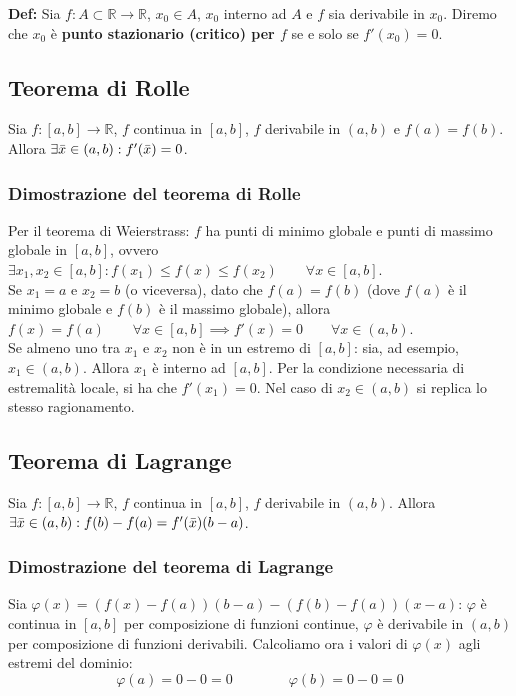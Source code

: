 \documentclass{article}
\begin{document}
\noindent\textbf{Def:} Sia $f: A \subset \mathbb{R} \xrightarrow{} \mathbb{R}$, $x_0 \in A$, $x_0$ interno ad $A$ e $f$ sia derivabile in $x_0$. Diremo che $x_0$ è \textbf{punto stazionario (critico) per $f$} se e solo se $f'(x_0) = 0$.

\subsection{Teorema di Rolle}
Sia $f: [a, b] \xrightarrow{} \mathbb{R}$, $f$ continua in $[a, b]$, $f$ derivabile in $(a, b)$ e $f(a) = f(b)$. Allora $\exists \Bar{x} \in (a, b) : f'(\Bar{x}) = 0$.

\subsubsection{Dimostrazione del teorema di Rolle}
Per il teorema di Weierstrass: $f$ ha punti di minimo globale e punti di massimo globale in $[a, b]$, ovvero $\exists x_1, x_2 \in [a, b] : f(x_1) \leq f(x) \leq f(x_2) \qquad \forall x \in [a, b]$.\\
Se $x_1 = a$ e $x_2 = b$ (o viceversa), dato che $f(a) = f(b)$ (dove $f(a)$ è il minimo globale e $f(b)$ è il massimo globale), allora $f(x) = f(a) \qquad \forall x \in [a, b] \implies f'(x) = 0 \qquad \forall x \in (a, b)$.\\
Se almeno uno tra $x_1$ e $x_2$ non è in un estremo di $[a, b]$: sia, ad esempio, $x_1 \in (a, b)$. Allora $x_1$ è interno ad $[a, b]$. Per la condizione necessaria di estremalità locale, si ha che $f'(x_1) = 0$. Nel caso di $x_2 \in (a, b)$ si replica lo stesso ragionamento.

\subsection{Teorema di Lagrange}
Sia $f: [a, b] \xrightarrow{} \mathbb{R}$, $f$ continua in $[a, b]$, $f$ derivabile in $(a, b)$. Allora $\exists \Bar{x} \in (a, b) : f(b) - f(a) = f'(\Bar{x})(b - a)$.

\subsubsection{Dimostrazione del teorema di Lagrange}
Sia $\varphi(x) = (f(x) - f(a))(b - a) - (f(b) - f(a))(x - a)$: $\varphi$ è continua in $[a, b]$ per composizione di funzioni continue, $\varphi$ è derivabile in $(a, b)$ per composizione di funzioni derivabili. Calcoliamo ora i valori di $\varphi(x)$ agli estremi del dominio:
\begin{equation*}
    \varphi(a) = 0 - 0 = 0 \qquad \qquad \varphi(b) = 0 - 0 = 0
\end{equation*}
\end{document}
